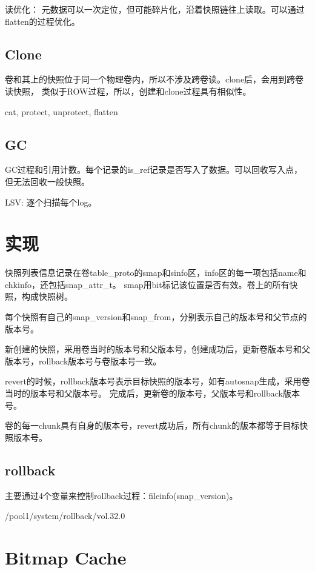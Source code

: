 读优化： 元数据可以一次定位，但可能碎片化，沿着快照链往上读取。可以通过flatten的过程优化。

\subsection{Clone}

卷和其上的快照位于同一个物理卷内，所以不涉及跨卷读。clone后，会用到跨卷读快照，
类似于ROW过程，所以，创建和clone过程具有相似性。

cat, protect, unprotect, flatten

\subsection{GC}

GC过程和引用计数。每个记录的is\_ref记录是否写入了数据。可以回收写入点，但无法回收一般快照。

LSV: 逐个扫描每个log。

\section{实现}

快照列表信息记录在卷table\_proto的smap和sinfo区，info区的每一项包括name和chkinfo，还包括snap\_attr\_t。
smap用bit标记该位置是否有效。卷上的所有快照，构成快照树。

每个快照有自己的snap\_version和snap\_from，分别表示自己的版本号和父节点的版本号。

新创建的快照，采用卷当时的版本号和父版本号，创建成功后，更新卷版本号和父版本号，rollback版本号与卷版本号一致。

revert的时候，rollback版本号表示目标快照的版本号，如有autosnap生成，采用卷当时的版本号和父版本号。
完成后，更新卷的版本号，父版本号和rollback版本号。

卷的每一chunk具有自身的版本号，revert成功后，所有chunk的版本都等于目标快照版本号。

\subsection{rollback}

主要通过4个变量来控制rollback过程：fileinfo(snap\_version)。

/pool1/system/rollback/vol.32.0

\section{Bitmap Cache}

